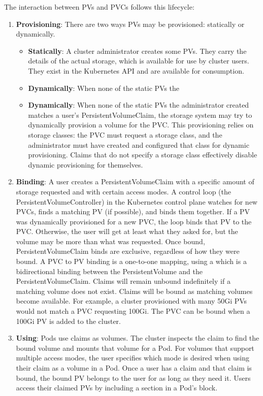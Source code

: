 The interaction between PVs and PVCs follows this lifecycle:
\begin{enumerate}
	\item \textbf{Provisioning}: There are two ways PVs may be provisioned:
	      statically or dynamically.
	      \begin{itemize}
		      \item \textbf{Statically}: A cluster administrator creates some
		            PVs. They carry the details of the actual storage, which is
		            available for use by cluster users. They exist in the
		            Kubernetes API and are available for consumption. \item
		            \textbf{Dynamically}: When none of the static PVs the
		      \item \textbf{Dynamically}: When none of the static PVs the
		            administrator created matches a user's
		            PersistentVolumeClaim, the storage system may try to
		            dynamically provision a volume for the PVC. This
		            provisioning relies on storage classes: the PVC must request
		            a storage class, and the administrator must have created and
		            configured that class for dynamic provisioning. Claims that
		            do not specify a storage class effectively disable dynamic
		            provisioning for themselves.
	      \end{itemize}
	\item \textbf{Binding}: A user creates a PersistentVolumeClaim with a
	      specific amount of storage requested and with certain access modes. A
	      control loop (the PersistentVolumeController) in the Kubernetes
	      control plane watches for new PVCs, finds a matching PV (if possible),
	      and binds them together. If a PV was dynamically provisioned for a new
	      PVC, the loop binds that PV to the PVC. Otherwise, the user will get
	      at least what they asked for, but the volume may be more than what was
	      requested. Once bound, PersistentVolumeClaim binds are exclusive,
	      regardless of how they were bound. A PVC to PV binding is a one-to-one
	      mapping, using a  which is a bidirectional binding
	      between the PersistentVolume and the PersistentVolumeClaim. Claims
	      will remain unbound indefinitely if a matching volume does not exist.
	      Claims will be bound as matching volumes become available. For
	      example, a cluster provisioned with many 50Gi PVs would not match a
	      PVC requesting 100Gi. The PVC can be bound when a 100Gi PV is added to
	      the cluster.
	\item \textbf{Using}: Pods use claims as volumes. The cluster inspects the
	      claim to find the bound volume and mounts that volume for a Pod. For
	      volumes that support multiple access modes, the user specifies which
	      mode is desired when using their claim as a volume in a Pod. Once a
	      user has a claim and that claim is bound, the bound PV belongs to the
	      user for as long as they need it. Users access their claimed PVs by
	      including a  section in a Pod's 
	      block.
\end{enumerate}

